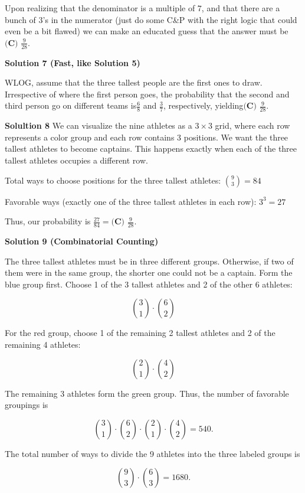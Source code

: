 \begin{enumerate}
Upon realizing that the denominator is a multiple of $7$, and that there are a bunch of $3$'s in the numerator (just do some C&P with the right logic that could even be a bit flawed) we can make an educated guess that the answer must be $\boxed{\textbf{(C) }\frac{9}{28}}.$




\textbf{Solution 7 (Fast, like Solution 5)}

WLOG, assume that the three tallest people are the first ones to draw. Irrespective of where the first person goes, the probability that the second and third person go on different teams is$\frac{6}{8}$ and $\frac{3}{7}$, respectively, yielding$\boxed{\textbf{(C) }\frac{9}{28}}.$

 \textbf{Solultion 8} We can visualize the nine athletes as a $3 \times 3$ grid, where each row represents a color group and each row contains 3 positions. We want the three tallest athletes to become captains. This happens exactly when each of the three tallest athletes occupies a different row.

 Total ways to choose positions for the three tallest athletes: $\binom{9}{3} = 84$

 Favorable ways (exactly one of the three tallest athletes in each row): $3^3=27$

 Thus, our probability is $\frac{27}{84} = \boxed{\textbf{(C) }\frac{9}{28}}.$




\textbf{Solution 9 (Combinatorial Counting)}

The three tallest athletes must be in three different groups. Otherwise, if two of them were in the same group, the shorter one could not be a captain. Form the blue group first. Choose 1 of the 3 tallest athletes and 2 of the other 6 athletes:

 
 \[{3 \choose 1}\cdot{6 \choose 2}\]

 For the red group, choose 1 of the remaining 2 tallest athletes and 2 of the remaining 4 athletes:

 
 \[{2 \choose 1}\cdot{4 \choose 2}\]

 The remaining 3 athletes form the green group. Thus, the number of favorable groupings is

 
 \[{3 \choose 1}\cdot{6 \choose 2}\cdot{2 \choose 1}\cdot{4 \choose 2}=540.\]

 The total number of ways to divide the 9 athletes into the three labeled groups is

 
 \[{9 \choose 3}\cdot{6 \choose 3}=1680.\]


\end{enumerate}
